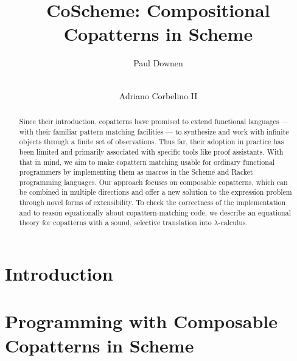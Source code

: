 \documentclass[runningheads]{llncs}
\begin{document}


%
\title{CoScheme: Compositional Copatterns in Scheme}
%
%
\author{
  Paul Downen
  \and \\
  Adriano Corbelino II
}
%
%
%
\maketitle              %
%
\begin{abstract}
  Since their introduction, copatterns have promised to extend functional languages --- with their familiar pattern matching facilities --- to synthesize and work with infinite objects through a finite set of observations.
 Thus far, their adoption in practice has been limited and primarily associated with specific tools like proof assistants.
 With that in mind, we aim to make copattern matching usable for ordinary functional programmers by implementing them as macros in the Scheme and Racket programming languages.
 Our approach focuses on composable copatterns, which can be combined in multiple directions and offer a new solution to the expression problem through novel forms of extensibility.
 To check the correctness of the implementation and to reason equationally about copattern-matching code, we describe an equational theory for copatterns with a sound, selective translation into $\lambda$-calculus.
\end{abstract}
%
%
%
\section{Introduction} \label{sec-intro}



\section{Programming with Composable Copatterns in Scheme}
\label{sec-examples}

\end{document}
